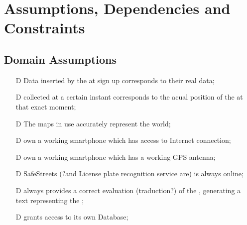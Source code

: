 \documentclass[../../rasd.tex]{subfiles}
\begin{document}
\section{Assumptions, Dependencies and Constraints}
	\subsection{Domain Assumptions}
	 	\begin{itemize}
	 		\item[D\subs{1}]Data inserted by the  at sign up corresponds to their real data;
	 		\item[D\subs{2}] collected at a certain instant corresponds to the acual position of the  at that exact moment;
	 		\item[D\subs{3}]The maps in use accurately represent the world;
	 		\item[D\subs{4}] own a working smartphone which has access to Internet connection;
	 		\item[D\subs{5}] own a working smartphone which has a working GPS antenna;
	 		\item[D\subs{6}]SafeStreets (?and License plate recognition service are) is always online;
	 		\item[D\subs{7}] always provides a correct evaluation (traduction?) of the , generating a text representing the ;
	 		\item[D\subs{8}] grants access to its own  Database;
	 		
	 	\end{itemize}
\end{document}
